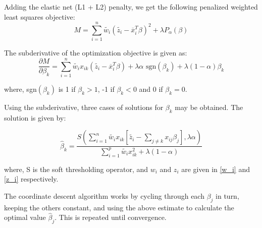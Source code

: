 \documentclass[12pt,a4paper]{report}
\begin{document}
Adding the elastic net (L1 + L2) penalty, we get the following penalized weighted least squares objective:
\begin{equation} \label{objective}
M = \sum_{i=1}^n \widetilde{w_i} (\widetilde{z_i} - \overline x_i^T \beta)^2
	 + \lambda P_{\alpha}(\beta)
\end{equation}

The subderivative of the optimization objective is given as:
\begin{equation}
\frac{ \partial M}{\partial \beta_k} = \sum_{i=1}^n \widetilde{w_i} x_{ik} (\widetilde{ z_i} - \overline x_i^T \beta ) + \lambda \alpha \mbox{ sgn}(\beta_k) + \lambda (1-\alpha)\beta_k
\end{equation}

where, sgn$(\beta_k)$ is 1 if $\beta_k > 1$, -1 if $\beta_k<0$ and 0 if $\beta_k = 0$.

Using the subderivative, three cases of solutions for $\beta_k$ may be obtained. The solution is given by:

\begin{equation} \label{beta}
\hat \beta_k = \frac{S\left(\sum_{i=1}^n \widetilde{w_i} x_{ik} \left[\widetilde{ z_i} - \sum_{j \ne k} x_{ij} \beta_j \right], \lambda \alpha \right)}
					{\sum_{i=1}^p \widetilde{w_i} x_{ik}^2 + \lambda (1- \alpha)}
\end{equation}

where, S is the soft thresholding operator, and $w_i$ and $z_i$ are given in \ref{w_i} and \ref{z_i} respectively.

The coordinate descent algorithm works by
cycling through each $\beta_j$ in turn, keeping the others constant, and using the above estimate to calculate the optimal value
$\hat \beta_j$. This is repeated until convergence.
\end{document}
